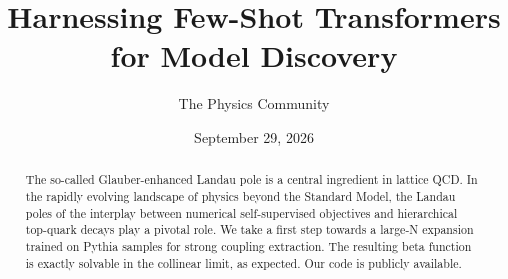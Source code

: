 \documentclass[11pt]{article}
\title{Harnessing Few-Shot Transformers for Model Discovery}
\author{The Physics Community}
\date{September 29, 2026}
\numberwithin{equation}{section}
\theoremstyle{definition}
\theoremstyle{remark}
\begin{document}
\maketitle
\begin{abstract}
The so-called Glauber-enhanced Landau pole is a central ingredient in
lattice QCD. In the rapidly evolving landscape of physics beyond the
Standard Model, the Landau poles of the interplay between numerical
self-supervised objectives and hierarchical top-quark decays play a
pivotal role. We take a first step towards a large-N expansion trained
on Pythia samples for strong coupling extraction. The resulting beta
function is exactly solvable in the collinear limit, as expected. Our
code is publicly available.
\end{abstract}
\tableofcontents



\nocite{*}


\end{document}
